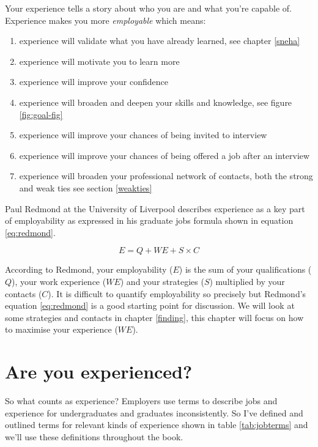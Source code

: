 \documentclass[
]{book}
\providecommand{\tightlist}{%
  \setlength{\itemsep}{0pt}\setlength{\parskip}{0pt}}
\begin{document}
Your experience tells a story about who you are and what you're capable of. Experience makes you more \emph{employable} which means:

\begin{enumerate}
\def\labelenumi{\arabic{enumi}.}
\tightlist
\item
  experience will validate what you have already learned, see chapter \ref{sneha}
\item
  experience will motivate you to learn more
\item
  experience will improve your confidence \citep{jackiecarter}
\item
  experience will broaden and deepen your skills and knowledge, see figure \ref{fig:goal-fig}
\item
  experience will improve your chances of being invited to interview
\item
  experience will improve your chances of being offered a job after an interview
\item
  experience will broaden your professional network of contacts, both the strong and weak ties see section \ref{weakties}
\end{enumerate}

Paul Redmond at the University of Liverpool describes experience as a key part of employability \citep{paulredmond} as expressed in his graduate jobs formula shown in equation \eqref{eq:redmond}.

\begin{equation}
  E = Q + WE + S \times C
  \label{eq:redmond}
\end{equation}

According to Redmond, your employability (\(E\)) is the sum of your qualifications (\(Q\)), your work experience (\(WE\)) and your strategies (\(S\)) multiplied by your contacts (\(C\)). It is difficult to quantify employability so precisely but Redmond's equation \eqref{eq:redmond} is a good starting point for discussion. We will look at some strategies and contacts in chapter \ref{finding}, this chapter will focus on how to maximise your experience (\(WE\)).

\hypertarget{areuexperienced}{%
\section{Are you experienced?}\label{areuexperienced}}

So what counts as experience? Employers use terms to describe jobs and experience for undergraduates and graduates inconsistently. So I've defined and outlined terms for relevant kinds of experience shown in table \ref{tab:jobterms} and we'll use these definitions throughout the book.
\end{document}
